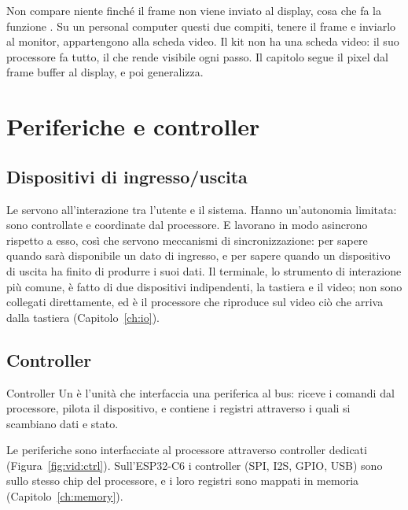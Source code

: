 Non compare niente finché il frame non viene inviato al display, cosa che fa
la funzione . Su un personal computer questi due
compiti, tenere il frame e inviarlo al monitor, appartengono alla scheda
video. Il kit non ha una scheda video: il suo processore fa tutto, il che
rende visibile ogni passo. Il capitolo segue il pixel dal frame buffer al
display, e poi generalizza.

\section{Periferiche e controller}

\subsection{Dispositivi di ingresso/uscita}

Le  servono all'interazione tra l'utente e il sistema. Hanno
un'autonomia limitata: sono controllate e coordinate dal processore. E
lavorano in modo asincrono rispetto a esso, così che servono meccanismi di
sincronizzazione: per sapere quando sarà disponibile un dato di ingresso, e
per sapere quando un dispositivo di uscita ha finito di produrre i suoi dati.
Il terminale, lo strumento di interazione più comune, è fatto di due
dispositivi indipendenti, la tastiera e il video; non sono collegati
direttamente, ed è il processore che riproduce sul video ciò che arriva dalla
tastiera (Capitolo~\ref{ch:io}).

\subsection{Controller}

\begin{definition}{Controller}
Un  è l'unità che interfaccia una periferica al bus: riceve i
comandi dal processore, pilota il dispositivo, e contiene i registri
attraverso i quali si scambiano dati e stato.
\end{definition}

Le periferiche sono interfacciate al processore attraverso controller dedicati
(Figura~\ref{fig:vid:ctrl}). Sull'ESP32-C6 i controller (SPI, I2S, GPIO, USB)
sono sullo stesso chip del processore, e i loro registri sono mappati in
memoria (Capitolo~\ref{ch:memory}).

